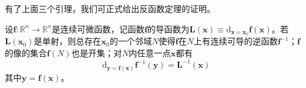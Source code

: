 \documentclass[main.tex]{subfiles}
\begin{document}
有了上面三个引理，我们可正式给出反函数定理的证明。
\begin{theorem}[反函数定理]
    设$\mathbf{f}:\mathbb{R}^n\rightarrow\mathbb{R}^n$是连续可微函数，记函数$\mathbf{f}$的导函数为$\mathbf{L}\left(\mathbf{x}\right)\equiv\mathrm{d}_{\mathbf{x}=\mathbf{x}_0}\mathbf{f}\left(\mathbf{x}\right)$。若$\mathbf{L}\left(\mathbf{x}_0\right)$是单射，则总存在$\mathbf{x}_0$的一个邻域$N$使得$\mathbf{f}$在$N$上有连续可导的逆函数$\mathbf{f}^{-1}$；$\mathbf{f}$的像的集合$\mathbf{f}\left(N\right)$也是开集；对$N$内任意一点$\mathbf{x}$都有
    \[
        \mathrm{d}_{\mathbf{y}=\mathbf{f}\left(\mathbf{x}\right)}\mathbf{f}^{-1}\left(\mathbf{y}\right)=\mathbf{L}^{-1}\left(\mathbf{x}\right)
    \]
    其中$\mathbf{y}=\mathbf{f}\left(\mathbf{x}\right)$。
\end{theorem}
\end{document}
